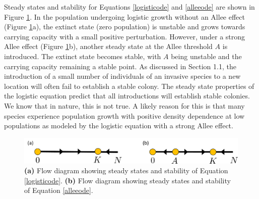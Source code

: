 \documentclass[12pt, openany]{book}
\theoremstyle{definition}
\theoremstyle{remark}
\numberwithin{equation}{chapter}
\numberwithin{figure}{chapter}
\begin{document}
Steady states and stability for Equations \ref{logisticode} and \ref{alleeode} are shown in Figure \ref{combinedflows}. In the population undergoing logistic growth without an Allee effect (Figure \ref{combinedflows}a), the extinct state (zero population) is unstable and grows towards carrying capacity with a small positive perturbation. However, under a strong Allee effect (Figure \ref{combinedflows}b), another steady state at the Allee threshold $A$ is introduced. The extinct state becomes stable, with $A$ being unstable and the carrying capacity remaining a stable point. As discussed in Section 1.1, the introduction of a small number of individuals of an invasive species to a new location will often fail to establish a stable colony. The steady state properties of the logistic equation predict that all introductions will establish stable colonies. We know that in nature, this is not true. A likely reason for this is that many species experience population growth with positive density dependence at low populations as modeled by the logistic equation with a strong Allee effect.

\begin{figure}[t!]
\begin{center}
       \includegraphics[width=1.0\textwidth]{combinedflows.png}
       \caption{\textbf{(a)} Flow diagram showing steady states and stability of Equation \ref{logisticode}. \textbf{(b)} Flow diagram showing steady states and stability of Equation \ref{alleeode}. \label{combinedflows}}
\end{center}
\end{figure}
\end{document}
